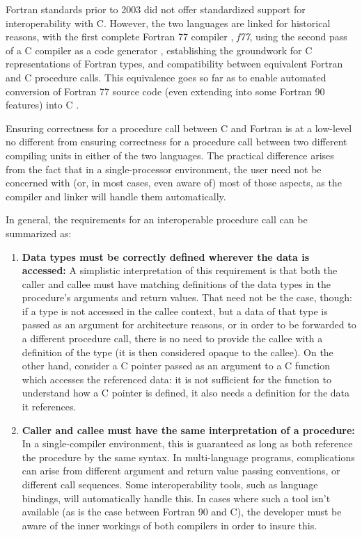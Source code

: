 Fortran standards prior to 2003 did not offer standardized support for interoperability with C. However, the two languages are linked for historical reasons, with the first complete Fortran 77 compiler \cite{feldman1985portable}, \textit{f77}, using the second pass of a C compiler as a code generator \cite{feldman1979implementation}, establishing the groundwork for C representations of Fortran types, and compatibility between equivalent Fortran and C procedure calls. This equivalence goes so far as to enable automated conversion of Fortran 77 source code (even extending into some Fortran 90 features) into C \cite{feldman1990fortran}. 

Ensuring correctness for a procedure call between C and Fortran is at a low-level no different from ensuring correctness for a procedure call between two different compiling units in either of the two languages. The practical difference arises from the fact that in a single-processor environment, the user need not be concerned with (or, in most cases, even aware of) most of those aspects, as the compiler and linker will handle them automatically.

In general, the requirements for an interoperable procedure call can be summarized as:
\begin{enumerate}
	\item \textbf{Data types must be correctly defined wherever the data is accessed:} A simplistic interpretation of this requirement is that both the caller and callee must have matching definitions of the data types in the procedure's arguments and return values. That need not be the case, though: if a type is not accessed in the callee context, but a data of that type is passed as an argument for architecture reasons, or in order to be forwarded to a different procedure call, there is no need to provide the callee with a definition of the type (it is then considered opaque to the callee). On the other hand, consider a C pointer passed as an argument to a C function which accesses the referenced data: it is not sufficient for the function to understand how a C pointer is defined, it also needs a definition for the data it references.
	\item \textbf{Caller and callee must have the same interpretation of a procedure:} In a single-compiler environment, this is guaranteed as long as both reference the procedure by the same syntax. In multi-language programs, complications can arise from different argument and return value passing conventions, or different call sequences. Some interoperability tools, such as language bindings, will automatically handle this. In cases where such a tool isn't available (as is the case between Fortran 90 and C), the developer must be aware of the inner workings of both compilers in order to insure this.
\end{enumerate}

